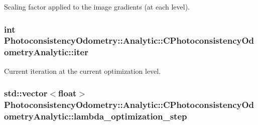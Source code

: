 \label{class_photoconsistency_odometry_1_1_analytic_1_1_c_photoconsistency_odometry_analytic_adb99f12e7b9b1aa4b31b766b51e8a3c0}
Scaling factor applied to the image gradients (at each level). \hypertarget{class_photoconsistency_odometry_1_1_analytic_1_1_c_photoconsistency_odometry_analytic_a8eea3326f2d11a5a30e53b171464ccb2}{
\subsubsection[{iter}]{\setlength{\rightskip}{0pt plus 5cm}int {\bf PhotoconsistencyOdometry::Analytic::CPhotoconsistencyOdometryAnalytic::iter}}}
\label{class_photoconsistency_odometry_1_1_analytic_1_1_c_photoconsistency_odometry_analytic_a8eea3326f2d11a5a30e53b171464ccb2}
Current iteration at the current optimization level. \hypertarget{class_photoconsistency_odometry_1_1_analytic_1_1_c_photoconsistency_odometry_analytic_a0c9b0540f2697f7b137b1a36ce3e2c18}{
\subsubsection[{lambda\_\-optimization\_\-step}]{\setlength{\rightskip}{0pt plus 5cm}std::vector$<$float$>$ {\bf PhotoconsistencyOdometry::Analytic::CPhotoconsistencyOdometryAnalytic::lambda\_\-optimization\_\-step}}}
\label{class_photoconsistency_odometry_1_1_analytic_1_1_c_photoconsistency_odometry_analytic_a0c9b0540f2697f7b137b1a36ce3e2c18}
